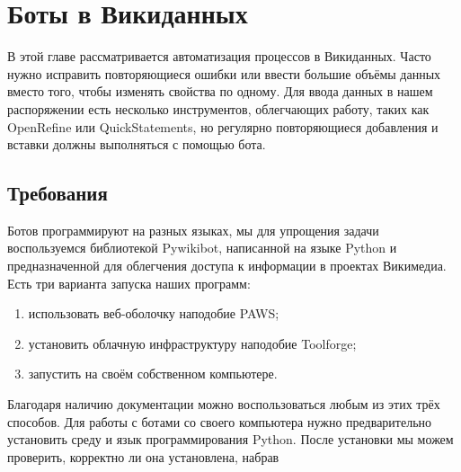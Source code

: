 \chapter{Боты в Викиданных}
\label{ch:bots}

В этой главе рассматривается автоматизация процессов в Викиданных. 
Часто нужно исправить повторяющиеся ошибки или ввести большие объёмы данных 
вместо того, чтобы изменять свойства по одному. 
Для ввода данных в нашем распоряжении есть несколько инструментов, облегчающих работу, 
таких как OpenRefine %
 или QuickStatements, но регулярно повторяющиеся добавления и вставки должны выполняться с помощью бота.


\section{Требования}

\label{sec:requirements}
Ботов программируют на разных языках, мы для упрощения задачи воспользуемся библиотекой Pywikibot, 
написанной на языке Python и предназначенной для облегчения доступа 
к информации в проектах Викимедиа. Есть три варианта запуска наших программ:
\begin{enumerate}
  \item использовать веб-оболочку наподобие PAWS; 
  \item установить облачную инфраструктуру наподобие Toolforge;
  \item запустить на своём собственном компьютере.
\end{enumerate}

Благодаря наличию документации 
можно воспользоваться любым из этих трёх способов. 
Для работы с ботами со своего компьютера нужно предварительно установить среду и язык программирования Python. 
После установки мы можем проверить, 
корректно ли она установлена, 
набрав


